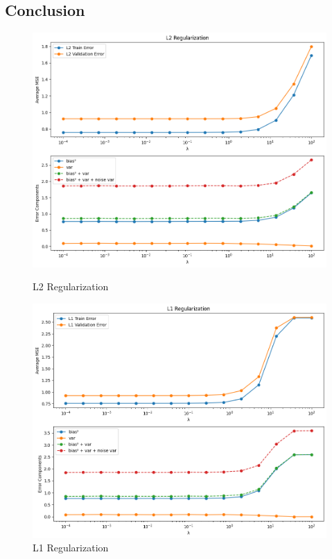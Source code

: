 \documentclass{article}
\begin{document}
\subsection{Conclusion}
\begin{figure}[h]
    \centering
    \begin{minipage}{0.50\textwidth}
        \centering
        \includegraphics[width=\textwidth]{figures/L2_Regularization.png} 
        \caption{L2 Regularization}
        \label{L2}
    \end{minipage}\hfill
    \begin{minipage}{0.50\textwidth}
        \centering
        \includegraphics[width=\textwidth]{figures/L1_Regularization.png} 
        \caption{L1 Regularization}
        \label{L1}
    \end{minipage}
\end{figure}
\end{document}
